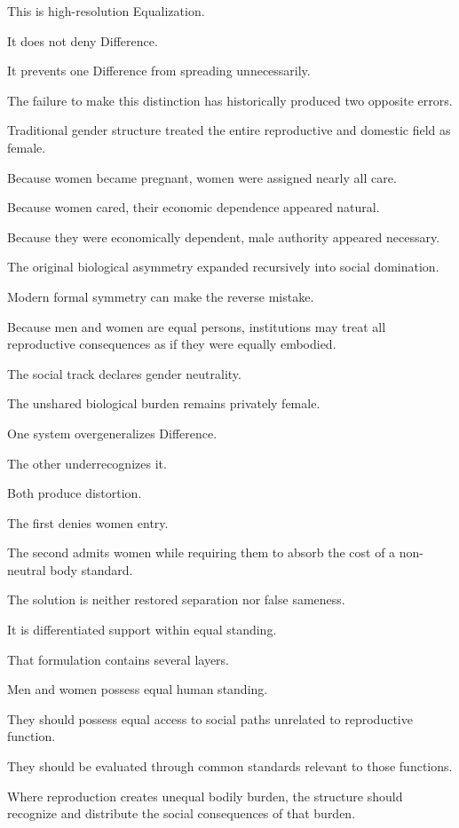 This is high-resolution Equalization.

It does not deny Difference.

It prevents one Difference from spreading unnecessarily.

The failure to make this distinction has historically produced two opposite errors.

Traditional gender structure treated the entire reproductive and domestic field as female.

Because women became pregnant, women were assigned nearly all care.

Because women cared, their economic dependence appeared natural.

Because they were economically dependent, male authority appeared necessary.

The original biological asymmetry expanded recursively into social domination.

Modern formal symmetry can make the reverse mistake.

Because men and women are equal persons, institutions may treat all reproductive consequences as if they were equally embodied.

The social track declares gender neutrality.

The unshared biological burden remains privately female.

One system overgeneralizes Difference.

The other underrecognizes it.

Both produce distortion.

The first denies women entry.

The second admits women while requiring them to absorb the cost of a non-neutral body standard.

The solution is neither restored separation nor false sameness.

It is differentiated support within equal standing.

That formulation contains several layers.

Men and women possess equal human standing.

They should possess equal access to social paths unrelated to reproductive function.

They should be evaluated through common standards relevant to those functions.

Where reproduction creates unequal bodily burden, the structure should recognize and distribute the social consequences of that burden.

